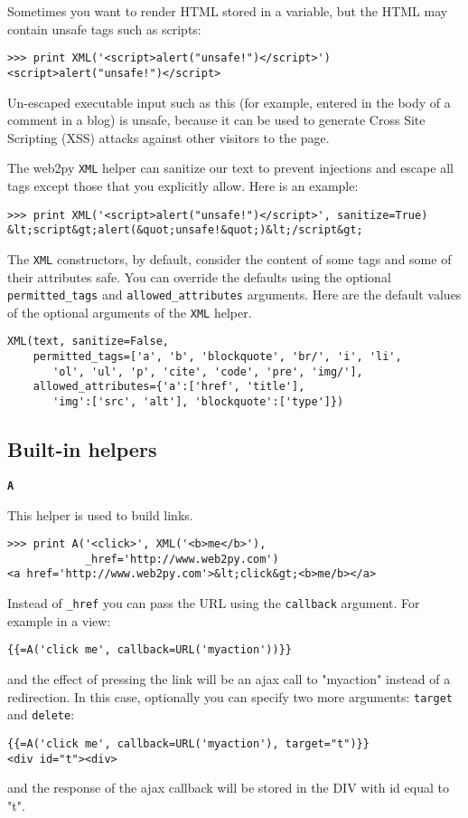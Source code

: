 \documentclass[justified,sixbynine,notoc]{tufte-book}
\def\ft{\small\tt}
\def\inxx#1{\index{#1}}
\begin{document}
\begin{fullwidth}
Sometimes you want to render HTML stored in a variable, but the HTML may contain unsafe tags such as scripts:
\begin{lstlisting}
>>> print XML('<script>alert("unsafe!")</script>')
<script>alert("unsafe!")</script>
\end{lstlisting}

Un-escaped executable input such as this (for example, entered in the body of a comment in a blog) is unsafe, because it can be used to generate Cross Site Scripting (XSS) attacks against other visitors to the page.

\inxx{sanitize}
The web2py {\ft XML} helper can sanitize our text to prevent injections and escape all tags except those that you explicitly allow. Here is an example:
\begin{lstlisting}
>>> print XML('<script>alert("unsafe!")</script>', sanitize=True)
&lt;script&gt;alert(&quot;unsafe!&quot;)&lt;/script&gt;
\end{lstlisting}

The {\ft XML} constructors, by default, consider the content of some tags and some of their attributes safe. You can override the defaults using the optional {\ft permitted\_tags} and {\ft allowed\_attributes} arguments. Here are the default values of the optional arguments of the {\ft XML} helper.
\begin{lstlisting}
XML(text, sanitize=False,
    permitted_tags=['a', 'b', 'blockquote', 'br/', 'i', 'li',
       'ol', 'ul', 'p', 'cite', 'code', 'pre', 'img/'],
    allowed_attributes={'a':['href', 'title'],
       'img':['src', 'alt'], 'blockquote':['type']})
\end{lstlisting}

\goodbreak\subsection{Built-in helpers}

{\bf {\ft A}}

This helper is used to build links.

\inxx{A}
\begin{lstlisting}
>>> print A('<click>', XML('<b>me</b>'),
            _href='http://www.web2py.com')
<a href='http://www.web2py.com'>&lt;click&gt;<b>me/b></a>
\end{lstlisting}

Instead of {\ft \_href} you can pass the URL using the {\ft callback} argument. For example in a view:

\begin{lstlisting}[keywords={}]
{{=A('click me', callback=URL('myaction'))}}
\end{lstlisting}
\noindent and the effect of pressing the link will be an ajax call to "myaction" instead of a redirection.
In this case, optionally you can specify two more arguments: {\ft target} and {\ft delete}:
\begin{lstlisting}[keywords={}]
{{=A('click me', callback=URL('myaction'), target="t")}}
<div id="t"><div>
\end{lstlisting}
and the response of the ajax callback will be stored in the DIV with id equal to "t".


\end{fullwidth}
\end{document}
